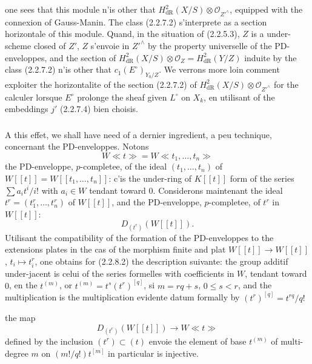 \documentclass[12pt,a4paper]{article}
\theoremstyle{plain}
\theoremstyle{definition}
\theoremstyle{remark}
\begin{document}
one sees that this module n'is other that $H^2_\mathrm{dR}(X/S) \otimes \mathcal{O}_{Z'^\wedge}$, equipped with the connexion of Gauss-Manin. The class (2.2.7.2) s'interprete as a section horizontale of this module. Quand, in the situation of (2.2.5.3), $Z$ is a under-scheme closed of $Z'$, $Z$ s'envoie in $Z'^\wedge$ by the property universelle of the PD-enveloppes, and the section of $H^2_\mathrm{dR}(X/S) \otimes \mathcal{O}_Z = H^2_\mathrm{dR}(Y/Z)$ induite by the class (2.2.7.2) n'is other that $c_1(E^\circ)_{Y_0/Z}$. We verrons more loin comment exploiter the horizontalite of the section (2.2.7.2) of $H^2_\mathrm{dR}(X/S) \otimes \mathcal{O}_{Z'^\wedge}$ for the calculer lorsque $E^\circ$ prolonge the sheaf given $L^\circ$ on $X_k$, en utilisant of the embeddings $j'$ (2.2.7.4) bien choisis.

\subsubsection{}
A this effet, we shall have need of a dernier ingredient, a peu technique, concernant the PD-enveloppes. Notons
\begin{equation}\tag{2.2.8.1}
W\ll t \gg = W\ll t_1, \ldots, t_n \gg 
\end{equation}
the PD-enveloppe, $p$-completee, of the ideal $(t_1, \ldots, t_n)$ of $W[[t]] = W[[t_1, \ldots, t_n]]$: c'is the under-ring of $K[[t]]$ form of the series $\sum a_i t^i/i!$ with $a_i \in W$ tendant toward $0$. Considerons maintenant the ideal $t^r = (t_1^r, \ldots, t_n^r)$ of $W[[t]]$, and the PD-enveloppe, $p$-completee, of $t^r$ in $W[[t]]$:
\begin{equation}\tag{2.2.8.2}
D_{(t^r)}(W[[t]]). 
\end{equation}
Utilisant the compatibility of the formation of the PD-enveloppes to the extensions plates \cite[I 2.7.4]{Berthelot} in the cas of the morphism finite and plat $W[[t]] \to W[[t]]$, $t_i \mapsto t_i^r$, one obtains for (2.2.8.2) the description suivante: the group additif under-jacent is celui of the series formelles with coefficients in $W$, tendant toward $0$, en the $t^{(m)}$, or $t^{(m)} = t^s(t^r)^{[q]}$, si $m = rq+s$, $0 \leqslant s < r$, and the multiplication is the multiplication evidente datum formally by $(t^r)^{[q]} = t^{rq}/q!$

the map
\begin{equation}\tag{2.2.8.3}
D_{(t^r)}(W[[t]]) \longrightarrow W\ll t \gg 
\end{equation}
defined by the inclusion $(t^r) \subset (t)$ envoie the element of base $t^{(m)}$ of multi-degree $m$ on $(m!/q!)t^{[m]}$ in particular is injective.
\end{document}
